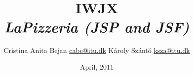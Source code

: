 \documentclass[10pt, a4paper]{article}
\title{IWJX \\ \emph{LaPizzeria (JSP and JSF)}}
\author{
Cristina Anita Bejan \href{mailto:cabe@itu.dk}{cabe@itu.dk}
K\'aroly Sz\'ant\'o \href{mailto:ksza@itu.dk}{ksza@itu.dk}\\
}
\date{April, 2011}
\begin{document}
\maketitle{}









\appendix


%
%
\end{document}
